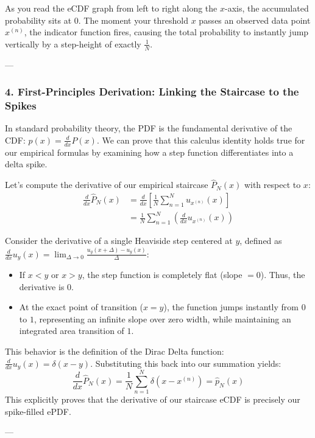 \documentclass{article}
\begin{document}
As you read the eCDF graph from left to right along the $x$-axis, the accumulated probability sits at 0. The moment your threshold $x$ passes an observed data point $x^{(n)}$, the indicator function fires, causing the total probability to instantly jump vertically by a step-height of exactly $\frac{1}{N}$.

---

\subsubsection*{4. First-Principles Derivation: Linking the Staircase to the Spikes}

In standard probability theory, the PDF is the fundamental derivative of the CDF: $p(x) = \frac{d}{dx}P(x)$. We can prove that this calculus identity holds true for our empirical formulas by examining how a step function differentiates into a delta spike.

Let's compute the derivative of our empirical staircase $\hat{P}_N(x)$ with respect to $x$:
\begin{align*}
\frac{d}{dx} \hat{P}_N(x) &= \frac{d}{dx} \left[ \frac{1}{N} \sum_{n=1}^{N} u_{x^{(n)}}(x) \right] \\
&= \frac{1}{N} \sum_{n=1}^{N} \left( \frac{d}{dx} u_{x^{(n)}}(x) \right)
\end{align*}

Consider the derivative of a single Heaviside step centered at $y$, defined as $\frac{d}{dx}u_y(x) = \lim_{\Delta \to 0} \frac{u_y(x + \Delta) - u_y(x)}{\Delta}$:
\begin{itemize}
    \item If $x < y$ or $x > y$, the step function is completely flat (slope $= 0$). Thus, the derivative is $0$.
    \item At the exact point of transition ($x = y$), the function jumps instantly from $0$ to $1$, representing an infinite slope over zero width, while maintaining an integrated area transition of $1$.
\end{itemize}
This behavior is the definition of the Dirac Delta function: $\frac{d}{dx}u_y(x) = \delta(x - y)$. Substituting this back into our summation yields:
\begin{equation*}
\frac{d}{dx} \hat{P}_N(x) = \frac{1}{N} \sum_{n=1}^{N} \delta(x - x^{(n)}) = \hat{p}_N(x)
\end{equation*}
This explicitly proves that the derivative of our staircase eCDF is precisely our spike-filled ePDF.

---
\end{document}
